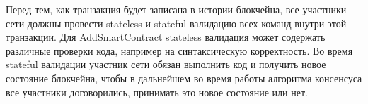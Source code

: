 Перед тем, как транзакция будет записана в истории блокчейна, все участники сети должны провести stateless и stateful валидацию всех команд внутри этой транзакции.
Для AddSmartContract stateless валидация может содержать различные проверки кода, например на синтаксическую корректность.
Во время stateful валидации участник сети обязан выполнить код и получить новое состояние блокчейна, чтобы в дальнейшем во время работы алгоритма консенсуса все участники договорились, принимать это новое состояние или нет.

\vspace{0.7cm}

